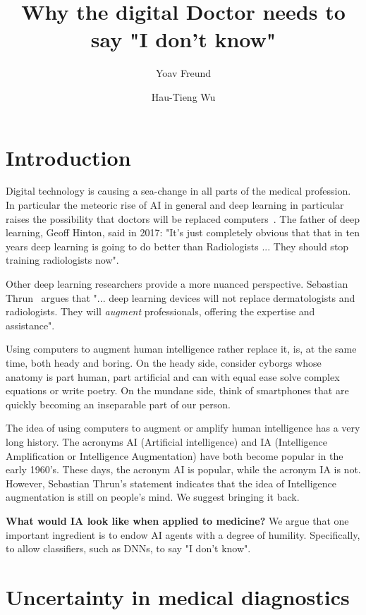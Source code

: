 \documentclass[10pt]{wlscirep}
\title{Why the digital Doctor needs to say "I don't know"}
\author[1]{Yoav Freund}
\author[2]{Hau-Tieng Wu}
\affil[1]{UCSD, department, city, postcode, country}
\affil[2]{Duke, department, city, postcode, country}
\begin{document}
\flushbottom
\maketitle

\thispagestyle{empty}

\section*{Introduction}

Digital technology is causing a sea-change in all parts of the medical profession. In particular the meteoric rise of AI in general and deep learning in particular raises the possibility that doctors will be replaced computers~\cite{Mukherjee2017}. The father of deep learning, Geoff Hinton, said in 2017: "It's just completely obvious that that in ten years deep learning is going to do better than Radiologists ... They should stop training radiologists now".

Other deep learning researchers provide a more nuanced perspective. Sebastian Thrun~\cite{Mukherjee2017,esteva2017dermatologist} argues that "... deep learning devices will not replace dermatologists and radiologists. They will {\em augment} professionals, offering the expertise and assistance".

Using computers to augment human intelligence rather replace it, is, at the same time, both heady and boring. On the heady side, consider cyborgs whose anatomy is part human, part artificial and can with equal ease solve complex equations or write poetry. On the mundane side, think of smartphones that are quickly becoming an inseparable part of our person. 
 
The idea of using computers to augment or amplify human intelligence has a very long history. The acronyms AI (Artificial intelligence) and IA (Intelligence Amplification or Intelligence Augmentation) have both become popular in the early 1960's\cite{ashby1957introduction,engelbart1962augmenting}. These days, the acronym AI is popular, while the acronym IA is not. However, Sebastian Thrun's statement indicates that the idea of Intelligence augmentation is still on people's mind. We suggest bringing it back.

{\bf What would IA look like when applied to medicine?} We argue that one important ingredient is to endow AI agents with a 
degree of humility. Specifically, to allow classifiers, such as DNNs, to say "I don't know". 

\section*{Uncertainty in medical diagnostics}
\end{document}
